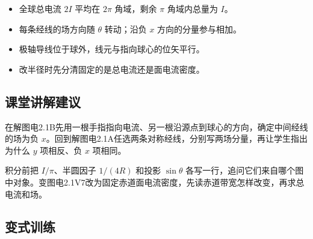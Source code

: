 \documentclass[UTF8,fontset=fandol,a4paper,11pt]{ctexart}
\begin{document}
\begin{itemize}
\item 全球总电流 $2I$ 平均在 $2\pi$ 角域，剩余 $\pi$ 角域内总量为 $I$。
\item 每条经线的场方向随 $\theta$ 转动；沿负 $x$ 方向的分量参与相加。
\item 极轴导线位于球外，线元与指向球心的位矢平行。
\item 改半径时先分清固定的是总电流还是面电流密度。
\end{itemize}



\subsection*{课堂讲解建议}

在解图电2.1B先用一根手指指向电流、另一根沿源点到球心的方向，确定中间经线的场为负 $x$。回到解图电2.1A任选两条对称经线，分别写两场分量，再让学生指出为什么 $y$ 项相反、负 $x$ 项相同。

积分前把 $I/\pi$、半圆因子 $1/(4R)$ 和投影 $\sin\theta$ 各写一行，追问它们来自哪个图中对象。变图电2.1V7改为固定赤道面电流密度，先读赤道带宽怎样改变，再求总电流和场。


\subsection*{变式训练}
\end{document}
